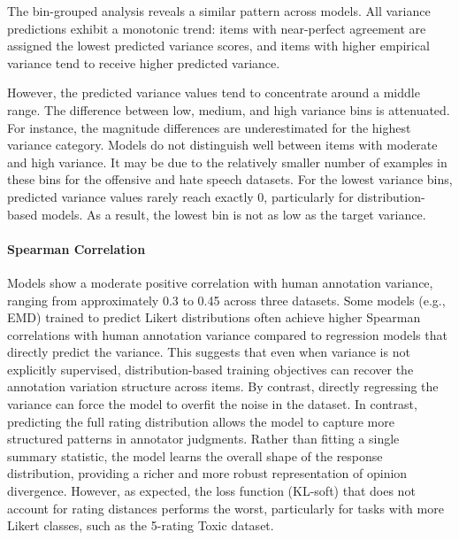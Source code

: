 \documentclass{article} %
\begin{document}
The bin-grouped analysis reveals a similar pattern across models. All variance predictions exhibit a monotonic trend: items with near-perfect agreement are assigned the lowest predicted variance scores, and items with higher empirical variance tend to receive higher predicted variance. 

\clearpage

However, the predicted variance values tend to concentrate around a middle range.
The difference between low, medium, and high variance bins is
attenuated. 
For instance, the magnitude differences are underestimated for the highest
variance category. Models do not distinguish well between items with moderate and high variance. It may be due to the relatively smaller number of examples in these bins for the offensive and hate speech datasets.
For the lowest variance bins, predicted variance values rarely reach exactly 0, particularly for distribution-based models. As a result, the lowest bin is not as low as the target variance.


\paragraph{Spearman Correlation}
Models show a moderate positive correlation with human annotation variance, ranging from approximately 0.3 to 0.45 across three datasets. Some models (e.g., EMD) trained to predict Likert distributions often achieve higher Spearman correlations with human annotation variance compared to regression models that directly predict the variance. 
This suggests that even when variance is not explicitly
supervised, distribution-based training objectives can recover the
annotation variation structure across items. By contrast, directly regressing the variance can force the model to overfit the noise in the dataset. In contrast, predicting the full rating distribution allows the model to capture more structured patterns in annotator judgments. Rather than fitting a single summary statistic, the model learns the overall shape of the response distribution, providing a richer and more robust representation of opinion divergence. 
However, as expected, the loss function (KL-soft) that does not account for rating distances performs the worst, particularly for tasks with more Likert classes, such as the 5-rating Toxic dataset.
\end{document}
